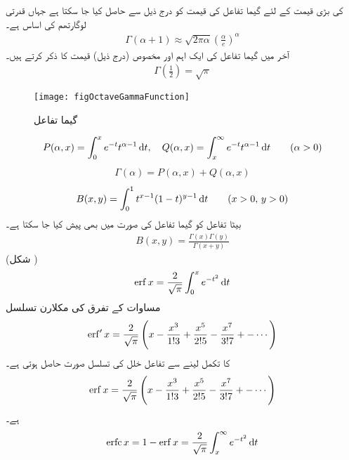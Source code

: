  کی بڑی قیمت کے لئے گیما تفاعل کی قیمت کو درج ذیل سے حاصل کیا جا سکتا ہے جہاں  قدرتی لوگارتھم کی اساس ہے۔
\begin{align}
\Gamma(\alpha+1)\approx \sqrt{2\pi \alpha}\left(\frac{\alpha}{e}\right)^\alpha
\end{align}
آخر میں گیما تفاعل کی ایک اہم اور مخصوص (درج ذیل) قیمت کا ذکر کرتے ہیں۔
\begin{align}
\Gamma\left(\frac{1}{2}\right)=\sqrt{\pi}
\end{align}
%
\begin{figure}
\centering
\texttt{[image: figOctaveGammaFunction]}
\caption{گیما تفاعل}
\label{شکل_ضمیمہ_مفید_گیما_تفاعل}
\end{figure}
%

\begin{align}
P(\alpha,x)=\int_{0}^{x} e^{-t}t^{\alpha-1}\dif t, \quad Q(\alpha,x)=\int_{x}^{\infty} e^{-t}t^{\alpha-1}\dif t \quad \quad (\alpha>0)
\end{align}
%
\begin{align}
\Gamma(\alpha)=P(\alpha,x)+Q(\alpha,x)
\end{align}
\begin{align}
B(x,y)=\int_{0}^{1}t^{x-1}(1-t)^{y-1}\dif t\quad \quad (x>0,\, y>0)
\end{align}
بیٹا تفاعل کو گیما تفاعل کی صورت میں بھی پیش کیا جا سکتا ہے۔
\begin{align}
B(x,y)=\frac{\Gamma(x) \Gamma(y)}{\Gamma(x+y)}
\end{align}
(شکل )
\begin{align}\label{مساوات_ضمیمہ_تفاعل_خلل_الف}
\erf x=\frac{2}{\sqrt{\pi}}\int_{0}^{x} e^{-t^2}\dif t
\end{align}
مساوات  کے تفرق  کی مکلارن تسلسل 
\begin{align*}
\operatorname{erf}' x=\frac{2}{\sqrt{\pi}}\left(x-\frac{x^3}{1!3}+\frac{x^5}{2!5}-\frac{x^7}{3!7}+-\cdots \right)
\end{align*}
 کا تکمل لینے سے تفاعل خلل کی تسلسل صورت حاصل ہوتی ہے۔
%
\begin{align}
\operatorname{erf} x=\frac{2}{\sqrt{\pi}}\left(x-\frac{x^3}{1!3}+\frac{x^5}{2!5}-\frac{x^7}{3!7}+-\cdots \right)
\end{align}
 ہے۔ 
\begin{align}
\erfc x=1-\erf x=\frac{2}{\sqrt{\pi}} \int_{x}^{\infty} e^{-t^2}\dif t
\end{align}
